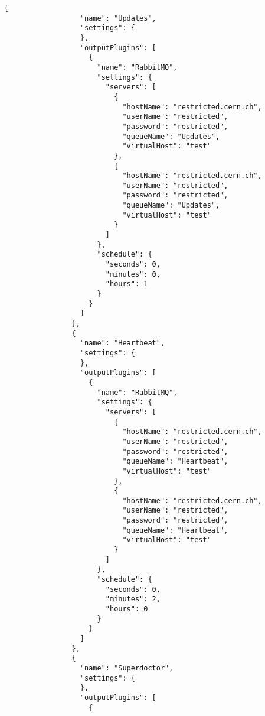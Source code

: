 \begin{lstlisting}[style=csharp, caption=Fichero de configuración]
                {
                  "name": "Updates",
                  "settings": {
                  },
                  "outputPlugins": [
                    {
                      "name": "RabbitMQ",
                      "settings": {
                        "servers": [
                          {
                            "hostName": "restricted.cern.ch",
                            "userName": "restricted",
                            "password": "restricted",
                            "queueName": "Updates",
                            "virtualHost": "test"
                          },
                          {
                            "hostName": "restricted.cern.ch",
                            "userName": "restricted",
                            "password": "restricted",
                            "queueName": "Updates",
                            "virtualHost": "test"
                          }
                        ]
                      },
                      "schedule": {
                        "seconds": 0,
                        "minutes": 0,
                        "hours": 1
                      }
                    }
                  ]
                },
                {
                  "name": "Heartbeat",
                  "settings": {
                  },
                  "outputPlugins": [
                    {
                      "name": "RabbitMQ",
                      "settings": {
                        "servers": [
                          {
                            "hostName": "restricted.cern.ch",
                            "userName": "restricted",
                            "password": "restricted",
                            "queueName": "Heartbeat",
                            "virtualHost": "test"
                          },
                          {
                            "hostName": "restricted.cern.ch",
                            "userName": "restricted",
                            "password": "restricted",
                            "queueName": "Heartbeat",
                            "virtualHost": "test"
                          }
                        ]
                      },
                      "schedule": {
                        "seconds": 0,
                        "minutes": 2,
                        "hours": 0
                      }
                    }
                  ]
                },
                {
                  "name": "Superdoctor",
                  "settings": {
                  },
                  "outputPlugins": [
                    {

\end{lstlisting}

